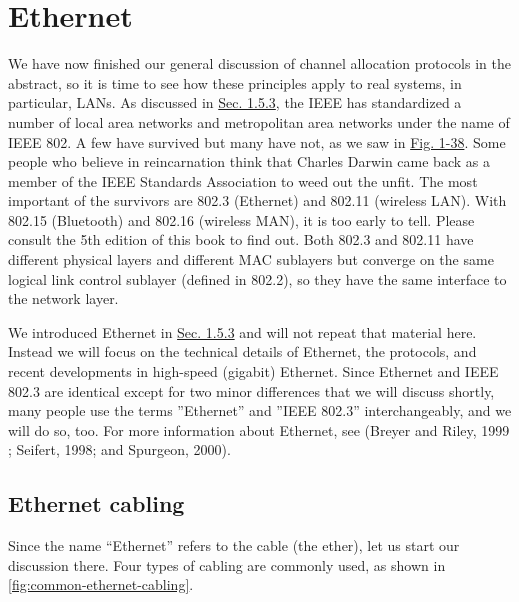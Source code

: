 \documentclass[b5paper,11pt]{memoir}
\begin{document}
\section{Ethernet}


We have now finished our general discussion of channel allocation
protocols in the abstract, so it is time to see how these principles
apply to real systems, in particular, LANs. As discussed in
\protect\hyperlink{0130661023_ch01lev1sec5.htmlux5cux23ch01lev2sec23}{Sec.
1.5.3}, the IEEE has standardized a number of local area networks and
metropolitan area networks under the name of IEEE 802. A few have
survived but many have not, as we saw in
\protect\hyperlink{0130661023_ch01lev1sec6.htmlux5cux23ch01fig38}{Fig.
1-38}. Some people who believe in reincarnation think that Charles
Darwin came back as a member of the IEEE Standards Association to weed
out the unfit. The most important of the survivors are 802.3 (Ethernet)
and 802.11 (wireless LAN). With 802.15 (Bluetooth) and 802.16 (wireless
MAN), it is too early to tell. Please consult the 5th edition of this
book to find out. Both 802.3 and 802.11 have different physical layers
and different MAC sublayers but converge on the same logical link
control sublayer (defined in 802.2), so they have the same interface to
the network layer.

We introduced Ethernet in
\protect\hyperlink{0130661023_ch01lev1sec5.htmlux5cux23ch01lev2sec23}{Sec.
1.5.3} and will not repeat that material here. Instead we will focus on
the technical details of Ethernet, the protocols, and recent
developments in high-speed (gigabit) Ethernet. Since Ethernet and IEEE
802.3 are identical except for two minor differences that we will
discuss shortly, many people use the terms ''Ethernet'' and ''IEEE
802.3'' interchangeably, and we will do so, too. For more information
about Ethernet, see (Breyer and Riley, 1999 ; Seifert, 1998; and
Spurgeon, 2000).

\subsection{Ethernet cabling}

Since the name ``Ethernet'' refers to the cable (the ether), let us start our discussion there.
Four types of cabling are commonly used, as shown in \cref{fig:common-ethernet-cabling}.
\end{document}
